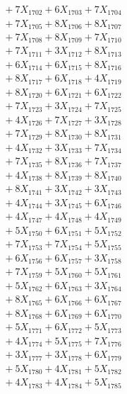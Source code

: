 \documentclass[a4paper,10pt]{article}
\begin{document}
{\begin{align}
&\;  + 7 X_{1702} + 6 X_{1703} + 7 X_{1704} \\[0.3ex]
&\;  + 7 X_{1705} + 8 X_{1706} + 8 X_{1707} \\[0.3ex]
&\;  + 7 X_{1708} + 8 X_{1709} + 7 X_{1710} \\[0.3ex]
&\;  + 7 X_{1711} + 3 X_{1712} + 8 X_{1713} \\[0.3ex]
&\;  + 6 X_{1714} + 6 X_{1715} + 8 X_{1716} \\[0.3ex]
&\;  + 8 X_{1717} + 6 X_{1718} + 4 X_{1719} \\[0.5ex]\allowbreak
&\;  + 8 X_{1720} + 6 X_{1721} + 6 X_{1722} \\[0.3ex]
&\;  + 7 X_{1723} + 3 X_{1724} + 7 X_{1725} \\[0.3ex]
&\;  + 4 X_{1726} + 7 X_{1727} + 3 X_{1728} \\[0.3ex]
&\;  + 7 X_{1729} + 8 X_{1730} + 8 X_{1731} \\[0.3ex]
&\;  + 4 X_{1732} + 3 X_{1733} + 7 X_{1734} \\[0.3ex]
&\;  + 7 X_{1735} + 8 X_{1736} + 7 X_{1737} \\[0.3ex]
&\;  + 4 X_{1738} + 8 X_{1739} + 8 X_{1740} \\[0.3ex]
&\;  + 8 X_{1741} + 3 X_{1742} + 3 X_{1743} \\[0.3ex]
&\;  + 4 X_{1744} + 3 X_{1745} + 6 X_{1746} \\[0.3ex]
&\;  + 4 X_{1747} + 4 X_{1748} + 4 X_{1749} \\[0.5ex]\allowbreak
&\;  + 5 X_{1750} + 6 X_{1751} + 5 X_{1752} \\[0.3ex]
&\;  + 7 X_{1753} + 7 X_{1754} + 5 X_{1755} \\[0.3ex]
&\;  + 6 X_{1756} + 6 X_{1757} + 3 X_{1758} \\[0.3ex]
&\;  + 7 X_{1759} + 5 X_{1760} + 5 X_{1761} \\[0.3ex]
&\;  + 5 X_{1762} + 6 X_{1763} + 3 X_{1764} \\[0.3ex]
&\;  + 8 X_{1765} + 6 X_{1766} + 6 X_{1767} \\[0.3ex]
&\;  + 8 X_{1768} + 6 X_{1769} + 6 X_{1770} \\[0.3ex]
&\;  + 5 X_{1771} + 6 X_{1772} + 5 X_{1773} \\[0.3ex]
&\;  + 4 X_{1774} + 5 X_{1775} + 7 X_{1776} \\[0.3ex]
&\;  + 3 X_{1777} + 3 X_{1778} + 6 X_{1779} \\[0.5ex]\allowbreak
&\;  + 5 X_{1780} + 4 X_{1781} + 5 X_{1782} \\[0.3ex]
&\;  + 4 X_{1783} + 4 X_{1784} + 5 X_{1785} \\[0.3ex]

\end{align}}
\end{document}
